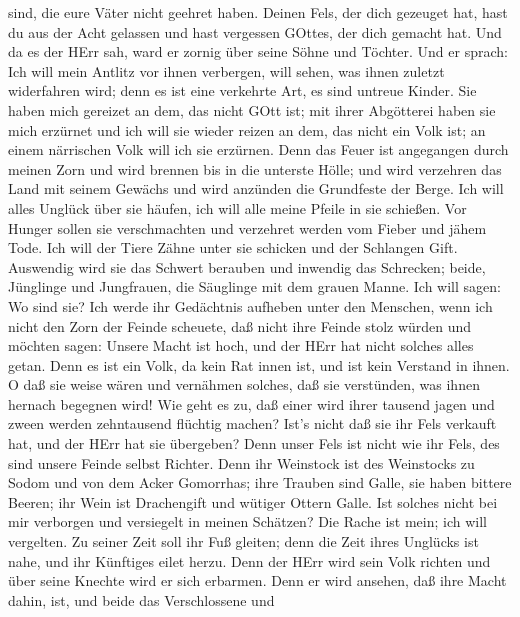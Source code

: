 sind, die eure Väter nicht geehret haben.  Deinen Fels, der
dich gezeuget hat, hast du aus der Acht gelassen und hast vergessen
GOttes, der dich gemacht hat.  Und da es der HErr sah, ward
er zornig über seine Söhne und Töchter.  Und er sprach: Ich
will mein Antlitz vor ihnen verbergen, will sehen, was ihnen zuletzt
widerfahren wird; denn es ist eine verkehrte Art, es sind untreue
Kinder.  Sie haben mich gereizet an dem, das nicht GOtt
ist; mit ihrer Abgötterei haben sie mich erzürnet und ich will sie
wieder reizen an dem, das nicht ein Volk ist; an einem närrischen Volk
will ich sie erzürnen.  Denn das Feuer ist angegangen durch
meinen Zorn und wird brennen bis in die unterste Hölle; und wird
verzehren das Land mit seinem Gewächs und wird anzünden die Grundfeste
der Berge.  Ich will alles Unglück über sie häufen, ich
will alle meine Pfeile in sie schießen.  Vor Hunger sollen
sie verschmachten und verzehret werden vom Fieber und jähem Tode. Ich
will der Tiere Zähne unter sie schicken und der Schlangen Gift.
 Auswendig wird sie das Schwert berauben und inwendig das
Schrecken; beide, Jünglinge und Jungfrauen, die Säuglinge mit dem grauen
Manne.  Ich will sagen: Wo sind sie? Ich werde ihr
Gedächtnis aufheben unter den Menschen,  wenn ich nicht den
Zorn der Feinde scheuete, daß nicht ihre Feinde stolz würden und möchten
sagen: Unsere Macht ist hoch, und der HErr hat nicht solches alles
getan.  Denn es ist ein Volk, da kein Rat innen ist, und
ist kein Verstand in ihnen.  O daß sie weise wären und
vernähmen solches, daß sie verstünden, was ihnen hernach begegnen wird!
 Wie geht es zu, daß einer wird ihrer tausend jagen und
zween werden zehntausend flüchtig machen? Ist's nicht daß sie ihr Fels
verkauft hat, und der HErr hat sie übergeben?  Denn unser
Fels ist nicht wie ihr Fels, des sind unsere Feinde selbst Richter.
 Denn ihr Weinstock ist des Weinstocks zu Sodom und von dem
Acker Gomorrhas; ihre Trauben sind Galle, sie haben bittere Beeren;
 ihr Wein ist Drachengift und wütiger Ottern Galle.
 Ist solches nicht bei mir verborgen und versiegelt in
meinen Schätzen?  Die Rache ist mein; ich will vergelten.
Zu seiner Zeit soll ihr Fuß gleiten; denn die Zeit ihres Unglücks ist
nahe, und ihr Künftiges eilet herzu.  Denn der HErr wird
sein Volk richten und über seine Knechte wird er sich erbarmen. Denn er
wird ansehen, daß ihre Macht dahin, ist, und beide das Verschlossene und
